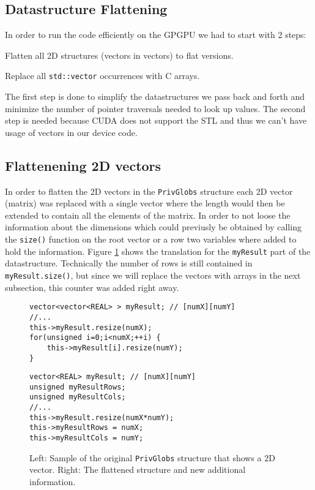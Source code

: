 \subsection{Datastructure Flattening}

In order to run the code efficiently on the GPGPU we had to start with 2 steps:
\begin{enumerate*}
	\item Flatten all 2D structures (vectors in vectors) to flat versions.
    \item Replace all \texttt{std::vector} occurrences with C arrays.
\end{enumerate*}

The first step is done to simplify the datastructures we pass back and forth
and minimize the number of pointer traversals needed to look up values. The
second step is needed because CUDA does not support the STL and thus we can't
have usage of vectors in our device code. 

\subsection{Flattenening 2D vectors}

In order to flatten the 2D vectors in the \texttt{PrivGlobs} structure each
2D vector (matrix) was replaced with a single vector where the length would then
be extended to contain all the elements of the matrix. In order to not loose
the information about the dimensions which could previusly be obtained by
calling the \texttt{size()} function on the root vector or a row two variables
where added to hold the information. Figure \ref{code:privglobsflatten} shows
the translation for the \texttt{myResult} part of the datastructure. Technically
the number of rows is still contained in \texttt{myResult.size()}, but since we
will replace the vectors with arrays in the next subsection, this counter was
added right away.

\begin{figure}[H]
\begin{minipage}{.45\textwidth}
\begin{lstlisting}
vector<vector<REAL> > myResult; // [numX][numY]
//...
this->myResult.resize(numX);
for(unsigned i=0;i<numX;++i) {
    this->myResult[i].resize(numY);
}
\end{lstlisting}
\end{minipage}\hfill
\begin{minipage}{.45\textwidth}
\begin{lstlisting}
vector<REAL> myResult; // [numX][numY]
unsigned myResultRows;
unsigned myResultCols;
//...
this->myResult.resize(numX*numY);
this->myResultRows = numX;
this->myResultCols = numY;
\end{lstlisting}
\end{minipage}
\caption{Left: Sample of the original \texttt{PrivGlobs} structure that shows a
2D vector. Right: The flattened structure and new additional information.}
\label{code:privglobsflatten}
\end{figure}

